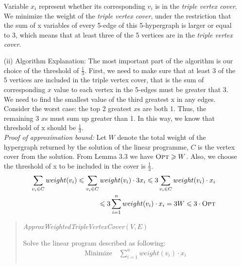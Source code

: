 \documentclass{article}
\renewcommand{\leq}{\leqslant}
\renewcommand{\geq}{\geqslant}
\newcounter{rcounter}
\newenvironment{rlist}%
{\begin{list}{\setnr-\arabic{rcounter}}{\usecounter{rcounter}}}{\end{list}}
\begin{document}
\begin{rlist}
\begin{enumerate}
            Variable $x_i$ represent whether its corresponding $v_i$ is in the \textit{triple vertex cover}. 
            We minimize the weight of the \textit{triple vertex cover}, under the restriction that the sum 
            of x variables of every 5-edge of this 5-hypergraph is larger or equal to 3, which means that 
            at least three of the 5 vertices are in the \textit{triple vertex cover}. 
            \item[(ii)] Algorithm Explanation: The most important part of the algorithm is our choice of the threshold of $\frac{1}{3}$. First, we need to make sure that
            at least 3 of the 5 vertices are included in the triple vertex cover, that is the sum of corresponding $x$ value to each vertex in the 5-edges
            must be greater that 3. We need to find the smallest value of the third greatest x in any edges. Consider the worst case: the top 2 greatest
            $x$s are both $1$. Thus, the remaining 3 $x$s must sum up greater than 1. In this way, we know that threshold of x should be $\frac{1}{3}$.\\
            \textit{Proof of approximation bound:} Let $W$ denote the total weight of the hypergraph returned by the solution of the linear programme, 
            $C$ is the vertex cover from the solution. From Lemma 3.3 we have $\textrm{\sc Opt} \geq W$. Also, we choose the threshold of x to be included in 
            the cover is $\frac{1}{3}$.
            \begin{eqnarray*}
                &&\sum_{v_i\in C} weight(v_i) \leq \sum_{v_i\in C} weight(v_i) \cdot 3x_i \leq 3 \sum_{v_i\in C} weight(v_i) \cdot x_i \\
                && \leq 3\sum_{i=1}^{n} weight(v_i) \cdot x_i = 3W \leq 3 \cdot \textrm{\sc Opt}
            \end{eqnarray*} 
            \begin{algorithm}
                \vspace*{2mm}
                \begin{quotation}
                    \noindent
                    \emph{ApproxWeightedTripleVertexCover}$(V,E)$
                    \begin{algorithmic}[1]
                        \State Solve the linear program described as following:
                        \begin{eqnarray*}
                            && \textrm{Minimize} \quad \sum_{i=1}^{n}weight(v_i) \cdot x_i \\

\end{eqnarray*}
\end{algorithmic}
\end{quotation}
\end{algorithm}
\end{enumerate}
\end{rlist}
\end{document}
